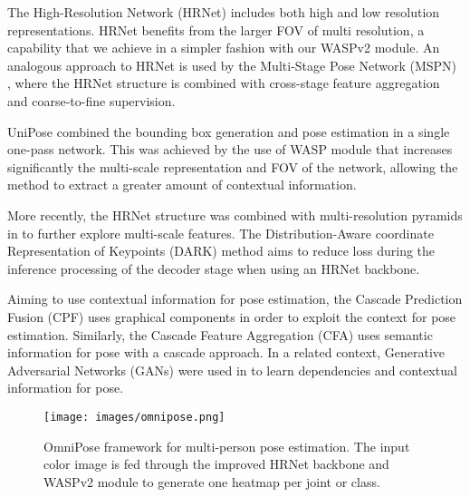 \documentclass[10pt,twocolumn,letterpaper]{article}
\begin{document}
The High-Resolution Network (HRNet) \cite{HRNet} includes both high and low resolution representations.
HRNet benefits from the larger FOV of multi resolution, a capability that we achieve in a simpler fashion with our WASPv2 module. 
An analogous approach to HRNet is used by the Multi-Stage Pose Network (MSPN) \cite{MSPN}, where the HRNet structure is combined with cross-stage feature aggregation and coarse-to-fine supervision.

UniPose \cite{UniPose} combined the bounding box generation and pose estimation in a single one-pass network. This was achieved by the use of WASP module that increases significantly the multi-scale representation and FOV of the network, allowing the method to extract a greater amount of contextual information.

More recently, the HRNet structure was combined with multi-resolution pyramids in \cite{HigherHRNet} to further explore multi-scale features. The Distribution-Aware coordinate Representation of Keypoints (DARK) method \cite{DarkPose} aims to reduce loss during the inference processing of the decoder stage when using an HRNet backbone.

Aiming to use contextual information for pose estimation, the Cascade Prediction Fusion (CPF) \cite{zhang2019human} uses graphical components in order to exploit the context for pose estimation. Similarly, the Cascade Feature Aggregation (CFA) \cite{su2019improvement} uses semantic information for pose with a cascade approach. In a related context, Generative Adversarial Networks (GANs) were used in \cite{SAGAN} to learn dependencies and contextual information for pose.





\begin{figure*}[t]
\begin{center}
\texttt{[image: images/omnipose.png]}
\end{center}
  \caption{OmniPose framework for multi-person pose estimation. The input color image is fed through the improved HRNet backbone and WASPv2 module to generate one heatmap per joint or class.}
\label{fig:OmniPose}
\end{figure*}
\end{document}
